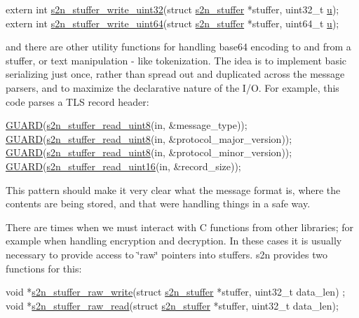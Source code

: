 \begin{DoxyCode}
\textcolor{keyword}{extern} \textcolor{keywordtype}{int} \hyperlink{s2n__stuffer_8c_a958a82fb4dfe3517bcfd95f46807f715}{s2n\_stuffer\_write\_uint32}(\textcolor{keyword}{struct} \hyperlink{structs2n__stuffer}{s2n\_stuffer} *stuffer, 
      uint32\_t \hyperlink{crypto_2pem_2pem_8h_a9a372ec768baa595be7fbb3a8825a797}{u});
\textcolor{keyword}{extern} \textcolor{keywordtype}{int} \hyperlink{s2n__stuffer_8c_af5be81568462bd6626c1d00a939ff30d}{s2n\_stuffer\_write\_uint64}(\textcolor{keyword}{struct} \hyperlink{structs2n__stuffer}{s2n\_stuffer} *stuffer, 
      uint64\_t \hyperlink{crypto_2pem_2pem_8h_a9a372ec768baa595be7fbb3a8825a797}{u});
\end{DoxyCode}


and there are other utility functions for handling base64 encoding to and from a stuffer, or text manipulation -\/ like tokenization. The idea is to implement basic serializing just once, rather than spread out and duplicated across the message parsers, and to maximize the declarative nature of the I/O. For example, this code parses a T\+LS record header\+:


\begin{DoxyCode}
\hyperlink{s2n__safety_8h_ad400572229cc8e40f7996837deb680f3}{GUARD}(\hyperlink{s2n__stuffer_8c_a1178687b6091eb483d135c149e87fb0b}{s2n\_stuffer\_read\_uint8}(in, &message\_type));
\hyperlink{s2n__safety_8h_ad400572229cc8e40f7996837deb680f3}{GUARD}(\hyperlink{s2n__stuffer_8c_a1178687b6091eb483d135c149e87fb0b}{s2n\_stuffer\_read\_uint8}(in, &protocol\_major\_version));
\hyperlink{s2n__safety_8h_ad400572229cc8e40f7996837deb680f3}{GUARD}(\hyperlink{s2n__stuffer_8c_a1178687b6091eb483d135c149e87fb0b}{s2n\_stuffer\_read\_uint8}(in, &protocol\_minor\_version));
\hyperlink{s2n__safety_8h_ad400572229cc8e40f7996837deb680f3}{GUARD}(\hyperlink{s2n__stuffer_8c_a788c22abe22da96107393257193632c5}{s2n\_stuffer\_read\_uint16}(in, &record\_size));
\end{DoxyCode}


This pattern should make it very clear what the message format is, where the contents are being stored, and that we\textquotesingle{}re handling things in a safe way.

There are times when we must interact with C functions from other libraries; for example when handling encryption and decryption. In these cases it is usually necessary to provide access to \char`\"{}raw\char`\"{} pointers into stuffers. s2n provides two functions for this\+:


\begin{DoxyCode}
\textcolor{keywordtype}{void} *\hyperlink{s2n__stuffer_8c_afdc941db81df32f38b7800210f3f2d11}{s2n\_stuffer\_raw\_write}(\textcolor{keyword}{struct} \hyperlink{structs2n__stuffer}{s2n\_stuffer} *stuffer, uint32\_t data\_len)
      ;
\textcolor{keywordtype}{void} *\hyperlink{s2n__stuffer_8c_a5148294f6ed0bf894afc83a31ee4f8a5}{s2n\_stuffer\_raw\_read}(\textcolor{keyword}{struct} \hyperlink{structs2n__stuffer}{s2n\_stuffer} *stuffer, uint32\_t data\_len);
\end{DoxyCode}


